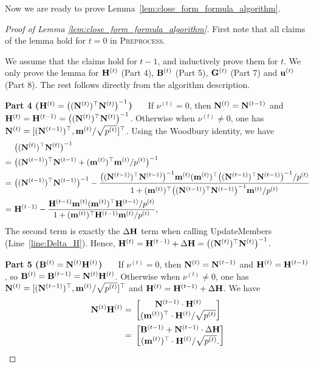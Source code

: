 Now we are ready to prove Lemma~\ref{lem:close_form_formula_algorithm}.
\begin{proof}[Proof of Lemma \ref{lem:close_form_formula_algorithm}]
First note that all claims of the lemma hold for $t=0$ in \textsc{Preprocess}. 

We assume that the claims hold for $t-1$, and inductively prove them for $t$. We only prove the lemma for $\mathbf{H}^{(t)}$ (Part 4), $\mathbf{B}^{(t)}$ (Part 5), $\mathbf{G}^{(t)}$ (Part 7) and $\mathbf{u}^{(t)}$ (Part 8). The rest follows directly from the algorithm description.

{ \bf Part 4 ($\mathbf{H}^{(t)} = \big( (\mathbf{N}^{(t)})^{\top} \mathbf{N}^{(t)} \big)^{-1}$) \ \ } If $\nu^{(t)} = 0$, then $\mathbf{N}^{(t)} = \mathbf{N}^{(t-1)}$ and $\mathbf{H}^{(t)} = \mathbf{H}^{(t-1)} = \big( (\mathbf{N}^{(t)})^{\top} \mathbf{N}^{(t)} \big)^{-1}$.
Otherwise when $\nu^{(t)} \neq 0$, one has $\mathbf{N}^{(t)} = [(\mathbf{N}^{(t-1)})^{\top}, \mathbf{m}^{(t)} / \sqrt{p^{(t)}}]^{\top}$. Using the Woodbury identity, we have
\begin{align*}
    &~\big( (\mathbf{N}^{(t)})^{\top} \mathbf{N}^{(t)} \big)^{-1} \\
    = &~ \big( (\mathbf{N}^{(t-1)})^{\top} \mathbf{N}^{(t-1)} + (\mathbf{m}^{(t)})^{\top} \mathbf{m}^{(t)} / p^{(t)} \big)^{-1} \\
    = &~ \big( (\mathbf{N}^{(t-1)})^{\top} \mathbf{N}^{(t-1)} \big)^{-1} - \frac{\big( (\mathbf{N}^{(t-1)})^{\top} \mathbf{N}^{(t-1)} \big)^{-1} \mathbf{m}^{(t)} (\mathbf{m}^{(t)})^{\top} \big( (\mathbf{N}^{(t-1)})^{\top} \mathbf{N}^{(t-1)} \big)^{-1} / p^{(t)}}{1 + (\mathbf{m}^{(t)})^{\top} \big( (\mathbf{N}^{(t-1)})^{\top} \mathbf{N}^{(t-1)} \big)^{-1} \mathbf{m}^{(t)} / p^{(t)}}\\
    = &~ \mathbf{H}^{(t-1)} - \frac{\mathbf{H}^{(t-1)} \mathbf{m}^{(t)} (\mathbf{m}^{(t)})^{\top} \mathbf{H}^{(t-1)} / p^{(t)}}{1 + (\mathbf{m}^{(t)})^{\top} \mathbf{H}^{(t-1)} \mathbf{m}^{(t)} / p^{(t)}},
\end{align*}
The second term is exactly the $\Delta \mathbf{H}$ term when calling {\sc UpdateMembers} (Line~\ref{line:Delta_H}). Hence, $\mathbf{H}^{(t)} = \mathbf{H}^{(t-1)} + \Delta \mathbf{H} = \big( (\mathbf{N}^{(t)})^{\top} \mathbf{N}^{(t)} \big)^{-1}$.



{ \bf Part 5 ($\mathbf{B}^{(t)} = \mathbf{N}^{(t)} \mathbf{H}^{(t)}$) \ \ } If $\nu^{(t)} = 0$, then $\mathbf{N}^{(t)} = \mathbf{N}^{(t-1)}$ and $\mathbf{H}^{(t)} = \mathbf{H}^{(t-1)}$, so $\mathbf{B}^{(t)} = \mathbf{B}^{(t-1)} = \mathbf{N}^{(t)} \mathbf{H}^{(t)}$.
Otherwise when $\nu^{(t)} \neq 0$, one has $\mathbf{N}^{(t)} = [(\mathbf{N}^{(t-1)})^{\top}, \mathbf{m}^{(t)} / \sqrt{p^{(t)}}]^{\top}$ and $\mathbf{H}^{(t)} = \mathbf{H}^{(t-1)} + \Delta \mathbf{H}$. We have
\begin{align*}
    \mathbf{N}^{(t)} \mathbf{H}^{(t)} = &~ 
    \begin{bmatrix}
    \mathbf{N}^{(t-1)} \cdot \mathbf{H}^{(t)} \\
    (\mathbf{m}^{(t)})^{\top} \cdot \mathbf{H}^{(t)} / \sqrt{p^{(t)}}
    \end{bmatrix} \\
    = &~ \begin{bmatrix}
    \mathbf{B}^{(t-1)} + \mathbf{N}^{(t-1)} \cdot \Delta \mathbf{H} \\
    (\mathbf{m}^{(t)})^{\top} \cdot \mathbf{H}^{(t)} / \sqrt{p^{(t)}}.
    \end{bmatrix}
\end{align*}


\end{proof}
